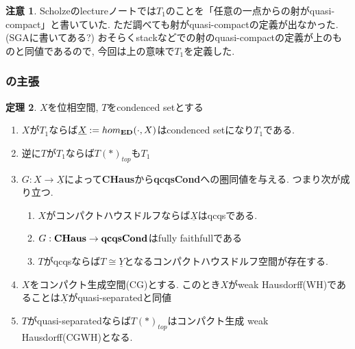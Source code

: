 \documentclass[dvipdfmx,a4paper,11pt]{article}
\theoremstyle{definition}
\newtheorem{thm}{定理}
\newtheorem{rem}[thm]{注意}
\begin{document}
 \begin{rem}
 Scholzeのlectureノート\cite{Sch19}では$T_1$のことを「任意の一点からの射がquasi-compact」と書いていた.
 ただ調べても射がquasi-compactの定義が出なかった. (SGAに書いてある?)
 おそらくstackなどでの射のquasi-compactの定義が上のものと同値であるので, 今回は上の意味で$T_1$を定義した. 
 
 \end{rem}


\subsubsection{\cite[Proposition 2.15, Theorem 2.16]{Sch19}の主張}

 \begin{tcolorbox}
 [colback = white, colframe = green!35!black, fonttitle = \bfseries,breakable = true]
\begin{thm}\cite[Proposition 2.15, Theorem 2.16]{Sch19}
\label{thm-Scholze-21516}
$X$を位相空間, $T$をcondenced setとする
\begin{enumerate}
\item $X$が$T_1$ならば$\underline{X}:=hom_{{\bf ED}}(\cdot, X)$はcondenced setになり$T_1$である. 
\item 逆に$T$が$T_1$ならば$T(\ast)_{top}$も$T_1$
\item $G : X \to \underline{X}$によって{\bf CHaus}から{\bf qcqsCond}への圏同値を与える. 
つまり次が成り立つ.
\begin{enumerate}
\item $X$がコンパクトハウスドルフならば$\underline{X}$はqcqsである.
\item $G : {\bf CHaus} \to {\bf qcqsCond}$はfully faithfullである
\item $T$がqcqsならば$T \cong \underline{Y}$となるコンパクトハウスドルフ空間が存在する. 
\end{enumerate}
\item $X$をコンパクト生成空間(CG)とする. このとき$X$がweak Hausdorff(WH)であることは$\underline{X}$がquasi-separatedと同値
\item $T$がquasi-separatedならば$T(\ast)_{top}$はコンパクト生成 weak Hausdorff(CGWH)となる.
\end{enumerate}
\end{thm}
 \end{tcolorbox}
 
\end{document}
